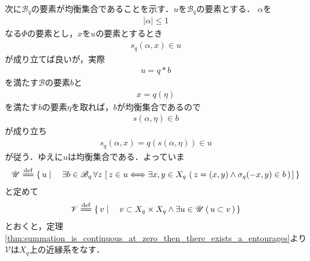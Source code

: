 \begin{sketch}
\begin{description}
				次に$\mathscr{B}_q$の要素が均衡集合であることを示す．$u$を$\mathscr{B}_q$の要素とする．
				$\alpha$を
				\begin{align}
					|\alpha| \leq 1
				\end{align}
				なる$\Phi$の要素とし，$x$を$u$の要素とするとき
				\begin{align}
					s_q(\alpha,x) \in u
				\end{align}
				が成り立てば良いが，実際
				\begin{align}
					u = q \ast b
				\end{align}
				を満たす$\mathscr{B}$の要素$b$と
				\begin{align}
					x = q(\eta)
				\end{align}
				を満たす$b$の要素$\eta$を取れば，$b$が均衡集合であるので
				\begin{align}
					s(\alpha,\eta) \in b
				\end{align}
				が成り立ち
				\begin{align}
					s_q(\alpha,x) = q\left(s(\alpha,\eta)\right) \in u
				\end{align}
				が従う．ゆえに$u$は均衡集合である．よっていま
				\begin{align}
					\mathscr{U} \defeq \Set{u}{\exists b \in \mathscr{B}_q\, 
					\forall z\, \left[\, z \in u \Longleftrightarrow 
					\exists x,y \in X_q\, \left(\, z=(x,y) \wedge \sigma_q(-x,y) \in b\, \right)\, \right]}
				\end{align}
				と定めて
				\begin{align}
					\mathscr{V} \defeq \Set{v}{v \subset X_q \times X_q \wedge \exists u \in \mathscr{U}\,
					(\, u \subset v\, )}
				\end{align}
				とおくと，定理\ref{thm:summation_is_continuous_at_zero_then_there_exists_a_entourages}より
				$\mathscr{V}$は$X_q$上の近縁系をなす．
				

\end{description}
\end{sketch}
